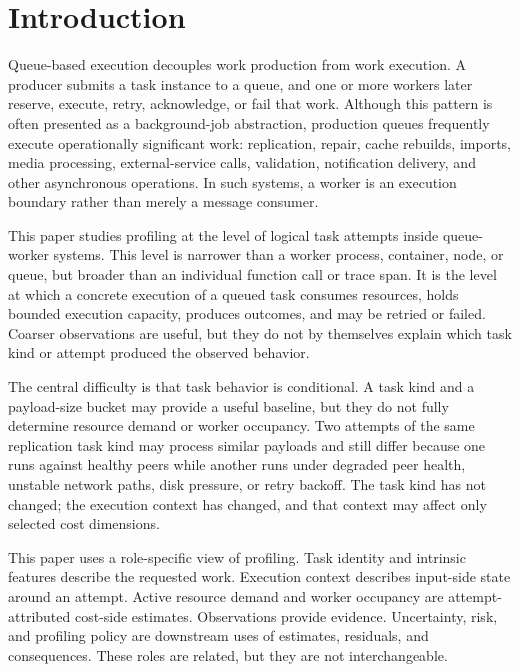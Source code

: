 \section{Introduction}
\label{sec:introduction}

Queue-based execution decouples work production from work execution. A producer
submits a task instance to a queue, and one or more workers later reserve,
execute, retry, acknowledge, or fail that work. Although this pattern is often
presented as a background-job abstraction, production queues frequently execute
operationally significant work: replication, repair, cache rebuilds, imports,
media processing, external-service calls, validation, notification delivery, and
other asynchronous operations. In such systems, a worker is an execution boundary
rather than merely a message consumer.

This paper studies profiling at the level of logical task attempts inside
queue-worker systems. This level is narrower than a worker process, container,
node, or queue, but broader than an individual function call or trace span. It is
the level at which a concrete execution of a queued task consumes resources,
holds bounded execution capacity, produces outcomes, and may be retried or
failed. Coarser observations are useful, but they do not by themselves explain
which task kind or attempt produced the observed behavior.

The central difficulty is that task behavior is conditional. A task kind and a
payload-size bucket may provide a useful baseline, but they do not fully
determine resource demand or worker occupancy. Two attempts of the same
replication task kind may process similar payloads and still differ because one
runs against healthy peers while another runs under degraded peer health,
unstable network paths, disk pressure, or retry backoff. The task kind has not
changed; the execution context has changed, and that context may affect only
selected cost dimensions.

This paper uses a role-specific view of profiling. Task identity and intrinsic
features describe the requested work. Execution context describes input-side
state around an attempt. Active resource demand and worker occupancy are
attempt-attributed cost-side estimates. Observations provide evidence.
Uncertainty, risk, and profiling policy are downstream uses of estimates,
residuals, and consequences. These roles are related, but they are not
interchangeable.

